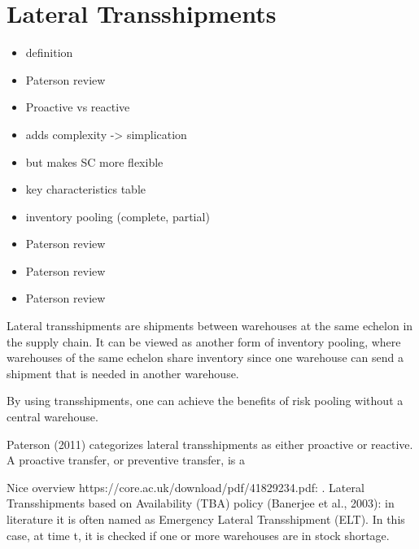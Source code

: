 \documentclass[../../main.tex]{subfiles}
\begin{document}

\section{Lateral Transshipments}

\begin{itemize}
\item definition
\item Paterson review
\item Proactive vs reactive
\item adds complexity -> simplication
\item but makes SC more flexible
\item key characteristics table
\item inventory pooling (complete, partial)
\item Paterson review
\item Paterson review
\item Paterson review
\end{itemize}

Lateral transshipments are shipments between warehouses at the same echelon in the supply chain. It can be viewed as another form of inventory pooling, where warehouses of the same echelon share inventory since one warehouse can send a shipment that is needed in another warehouse. 

By using transshipments, one can achieve the benefits of risk pooling without a central warehouse.

Paterson (2011) categorizes lateral transshipments as either proactive or reactive. A proactive transfer, or preventive transfer, is a 

Nice overview https://core.ac.uk/download/pdf/41829234.pdf:
. Lateral Transshipments based on Availability (TBA) policy (Banerjee et al., 2003): in literature it is often named as Emergency Lateral Transshipment (ELT). In this case, at time t, it is checked if one or more warehouses are in stock shortage. 



\end{document}
